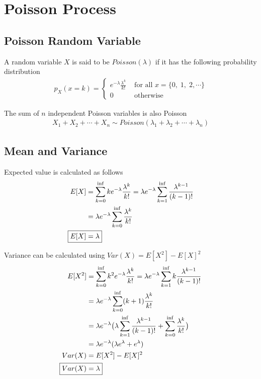 \documentclass[../../probability-notes.tex]{subfiles}
\begin{document}
    \section{Poisson Process}
    \subsection{Poisson Random Variable}
    A random variable $X$ is said to be $Poisson(\lambda)$ if it has the following probability distribution
    \begin{align*}
        p_{X}(x = k) = \begin{cases} e^{-\lambda} \frac{\lambda^{k}}{k!} &\text{ for all } x = \{ 0,\;1,\;2, \cdots \}\\
                                    0 &\text{ otherwise} \end{cases}
    \end{align*}

    The sum of $n$ independent Poisson variables is also Poisson
    \begin{align*}
        X_{1} + X_{2} + \cdots + X_{n} \sim Poisson(\lambda_{1} + \lambda_{2} + \cdots + \lambda_{n})
    \end{align*}

    \subsection{Mean and Variance}
    Expected value is calculated as follows
    \begin{align*}
        E[X] &= \sum_{k=0}^{\inf} ke^{-\lambda} \frac{\lambda^{k}}{k!} = \lambda e^{-\lambda} \sum_{k=1}^{\inf} \frac{\lambda^{k-1}}{(k-1)!}\\
        &= \lambda e^{-\lambda} \sum_{k=0}^{\inf} \frac{\lambda^{k}}{k!}\\
        \Aboxed{E[X] &= \lambda}
    \end{align*}

    Variance can be calculated using $Var(X) = E[X^{2}] - E[X]^{2}$
    \begin{align*}
        E[X^{2}] &= \sum_{k=0}^{\inf} k^{2} e^{-\lambda} \frac{\lambda^{k}}{k!} = \lambda e^{-\lambda} \sum_{k=1}^{\inf} k\frac{\lambda^{k-1}}{(k-1)!}\\
        &= \lambda e^{-\lambda} \sum_{k=0}^{\inf} (k+1) \frac{\lambda^{k}}{k!}\\
        &= \lambda e^{-\lambda} \big( \lambda \sum_{k=1}^{\inf} \frac{\lambda^{k-1}}{(k-1)!} + \sum_{k=0}^{\inf} \frac{\lambda^{k}}{k!} \big)\\
        &= \lambda e^{-\lambda} (\lambda e^{\lambda} + e^{\lambda})\\
        Var(X) &= E[X^{2}] - E[X]^{2}\\
        \Aboxed{Var(X) &= \lambda}
    \end{align*}
\end{document}
